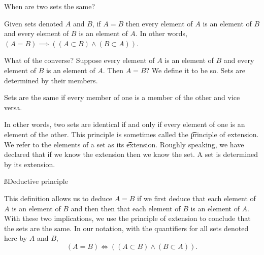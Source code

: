 


When are two sets the same?


Given sets denoted $A$ and $B$, if $A = B$ then every element of $A$ is an element of $B$ and every element of $B$ is an element of $A$.
In other words, $(A = B) \implies ((A \subset B) \land (B \subset A))$.




What of the converse?
Suppose every element of $A$ is an element of $B$ and every element of $B$ is an element of $A$.
Then $A = B$?
We define it to be so.
Sets are determined by their members.

\begin{principle}[Extension]
	Sets are the same if every member of one is a member of the other and vice versa.
\end{principle}

In other words, two sets are identical if and only if every element of one is an element of the other.
This principle is sometimes called the \t{principle of extension}.
We refer to the elements of a set as its \t{extension}.
Roughly speaking, we have declared that if we know the extension then we know the set.
A set is determined by its extension.

\ss{Deductive principle}

This definition allows us to deduce $A = B$ if we first deduce that each element of $A$ is an element of $B$ and then then that each element of $B$ is an element of $A$.
With these two implications, we use the principle of extension to conclude that the sets are the same.
In our notation, with the quantifiers for all sets denoted here by $A$ and $B$,
\[
	(A = B) \iff ((A \subset B) \land (B \subset A)).
\]

